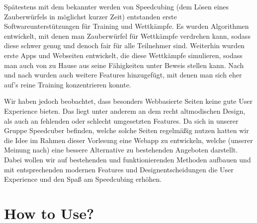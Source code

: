 \documentclass[a4paper]{article}
\theoremstyle{definition}
\begin{document}
Spätestens mit dem bekannter werden von Speedcubing (dem Lösen eines Zauberwürfels in möglichst kurzer Zeit)
entstanden erste Softwareunterstützungen für Training und Wettkämpfe. Es wurden Algorithmen entwickelt, mit denen
man Zauberwürfel für Wettkämpfe verdrehen kann, sodass diese schwer genug und denoch fair für alle Teilnehmer sind.
Weiterhin wurden erste Apps und Webseiten entwickelt, die diese Wettkämpfe simulieren, sodass man auch von zu
Hause aus seine Fähigkeiten unter Beweis stellen kann. Nach und nach wurden auch weitere Features hinzugefügt,
mit denen man sich eher auf's reine Training konzentrieren konnte.

Wir haben jedoch beobachtet, dass besonders Webbasierte Seiten keine gute User Experience bieten. Das liegt
unter anderem an dem recht altmodischen Design, als auch an fehlenden oder schlecht umgesetzten Features.
Da sich in unserer Gruppe Speedcuber befinden, welche solche Seiten regelmäßig nutzen hatten wir die Idee im
Rahmen dieser Vorlesung eine Webapp zu entwickeln, welche (unserer Meinung nach) eine bessere Alternative zu bestehenden
Angeboten darstellt. Dabei wollen wir auf bestehenden und funktionierenden Methoden aufbauen und mit entsprechenden
modernen Features und Designentscheidungen die User Experience und den Spaß am Speedcubing erhöhen.
\newpage
\section{How to Use?}
\end{document}
